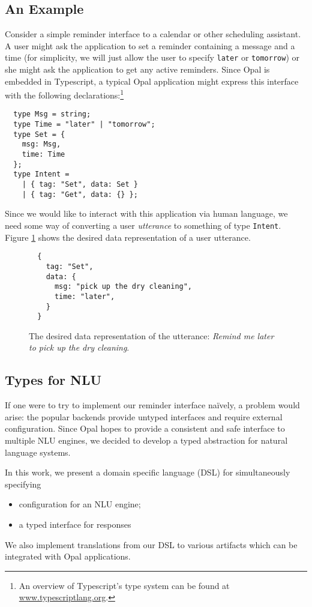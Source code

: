 \documentclass[twocolumn]{article}
\newcommand{\ts}[1]{\texttt{#1}}
\begin{document}
\subsection{An Example}
Consider a simple reminder interface to a calendar or other scheduling
assistant. A user might ask the application to set a reminder containing a
message and a time (for simplicity, we will just allow the user to specify
\ts{later} or \ts{tomorrow}) or she
might ask the application to get any active reminders. Since Opal is embedded
in Typescript, a typical Opal application might express this interface with the
following declarations:\footnote{An overview of Typescript's type system can be
  found at \url{www.typescriptlang.org}.}
\begin{verbatim}
  type Msg = string;
  type Time = "later" | "tomorrow";
  type Set = {
    msg: Msg,
    time: Time
  };
  type Intent =
    | { tag: "Set", data: Set }
    | { tag: "Get", data: {} };
\end{verbatim}

Since we would like to interact with this application via human language, we
need some way of converting a user \emph{utterance} to something of type
\ts{Intent}. Figure \ref{fig:drycleaning} shows the desired
data representation of a user utterance.

\begin{figure}
\begin{verbatim}
  {
    tag: "Set",
    data: {
      msg: "pick up the dry cleaning",
      time: "later",
    }
  }
\end{verbatim}
  \caption{The desired data representation of the utterance: \emph{Remind me
      later to pick up the dry cleaning}.}
  \label{fig:drycleaning}
\end{figure}

\subsection{Types for NLU}
If one were to try to implement our reminder interface na\"ively, a problem
would arise: the popular backends provide untyped interfaces and require
external configuration. Since Opal hopes to provide a consistent and safe
interface to multiple NLU engines, we decided to develop a typed abstraction for
natural language systems.

In this work, we present a domain specific language (DSL) for simultaneously
specifying
\begin{itemize}
\item configuration for an NLU engine;
\item a typed interface for responses
\end{itemize}
We also implement translations from our DSL to various artifacts which can be
integrated with Opal applications.
\\
\end{document}
